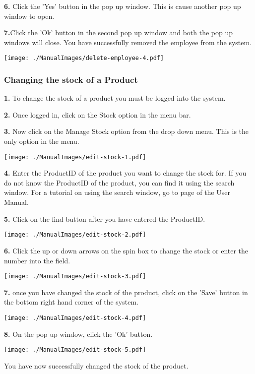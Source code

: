 \textbf{6.} Click the 'Yes' button in the pop up window. This is cause another pop up window to open.

\textbf{7.}Click the 'Ok' button in the second pop up window and both the pop up windows will close. You have successfully removed the employee from the system.

\texttt{[image: ./ManualImages/delete-employee-4.pdf]}

\pagebreak
\subsubsection{Changing the stock of a Product}
\label{fig:Changing the stock of a Product}

\textbf{1.} To change the stock of a product you must be logged into the system.

\textbf{2.} Once logged in, click on the Stock option in the menu bar.

\textbf{3.} Now click on the Manage Stock option from the drop down menu. This is the only option in the menu.

\texttt{[image: ./ManualImages/edit-stock-1.pdf]}

\textbf{4.} Enter the ProductID of the product you want to change the stock for. If you do not know the ProductID of the product, you can find it using the search window. For a tutorial on using the search window, go to page \pageref{fig:Using the search window} of the User Manual.

\textbf{5.} Click on the find button after you have entered the ProductID.

\texttt{[image: ./ManualImages/edit-stock-2.pdf]}

\textbf{6.} Click the up or down arrows on the spin box to change the stock or enter the number into the field.

\texttt{[image: ./ManualImages/edit-stock-3.pdf]}

\textbf{7.} once you have changed the stock of the product, click on the 'Save' button in the bottom right hand corner of the system.

\texttt{[image: ./ManualImages/edit-stock-4.pdf]}

\textbf{8.} On the pop up window, click the 'Ok' button.

\texttt{[image: ./ManualImages/edit-stock-5.pdf]}

You have now successfully changed the stock of the product.


